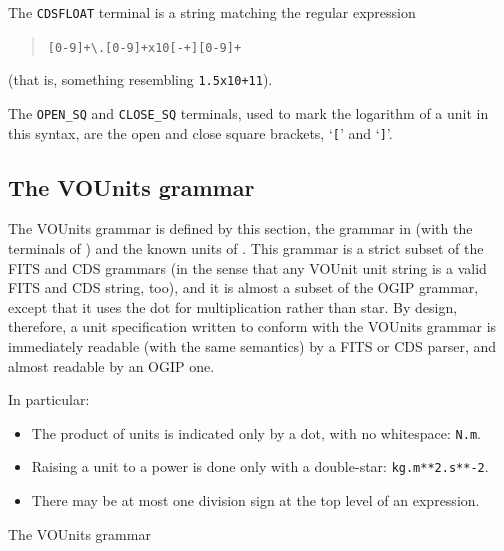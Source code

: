 \documentclass[11pt,notitlepage,onecolumn]{ivoa}
\begin{document}
The \texttt{CDSFLOAT} terminal is a string matching the regular
expression
\begin{quotation}
\texttt{[0-9]+\textbackslash.[0-9]+x10[-+][0-9]+}
\end{quotation}
(that is, something resembling \texttt{1.5x10+11}).

The \texttt{OPEN\_SQ} and \texttt{CLOSE\_SQ} terminals, used to mark
the logarithm of a unit in this syntax, are the open and close square
brackets, `\texttt{[}' and `\texttt{]}'.




\subsection{The VOUnits grammar}
\label{appx:vougrammar}

The VOUnits grammar is defined by this section, the grammar in
 (with the terminals
of ) and the known units
of .  This grammar is a strict subset of
the FITS and CDS grammars (in the sense that any VOUnit unit string is a
valid FITS and CDS string, too), and it is almost a subset of the OGIP
grammar, except that it uses the dot for multiplication rather than
star.  By design, therefore, a unit specification written to conform
with the VOUnits grammar is immediately readable (with the same
semantics) by a FITS or CDS parser, and almost readable by an OGIP
one.

In particular:
\begin{itemize}
\item The product of units is indicated only by a dot, with no
  whitespace: \texttt{N.m}.
\item Raising a unit to a power is done only with a double-star:
  \texttt{kg.m**2.s**-2}.
\item There may be at most one division sign at the top level of an
  expression.
\end{itemize}

\begin{table}[ht]

\caption{\label{tabx:vougrammar}The VOUnits grammar}
\end{table}

\end{document}
